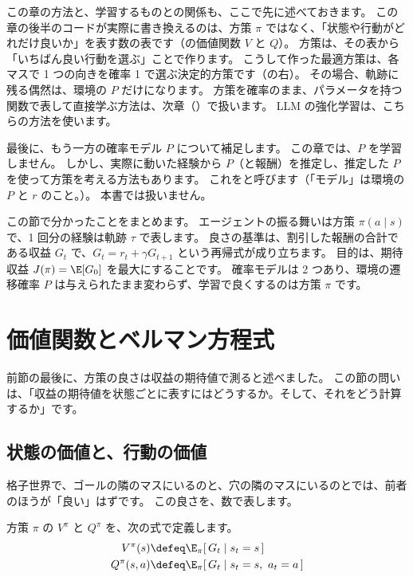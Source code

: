 この章の方法と、学習するものとの関係も、ここで先に述べておきます。
この章の後半のコードが実際に書き換えるのは、方策 $\pi$ ではなく、「状態や行動がどれだけ良いか」を表す数の表です（の価値関数 $V$ と $Q$）。
方策は、その表から「いちばん良い行動を選ぶ」ことで作ります。
こうして作った最適方策は、各マスで 1 つの向きを確率 1 で選ぶ決定的方策です（の右）。
その場合、軌跡に残る偶然は、環境の $P$ だけになります。
方策を確率のまま、パラメータを持つ関数で表して直接学ぶ方法は、次章（）で扱います。
LLM の強化学習は、こちらの方法を使います。

最後に、もう一方の確率モデル $P$ について補足します。
この章では、$P$ を学習しません。
しかし、実際に動いた経験から $P$（と報酬）を推定し、推定した $P$ を使って方策を考える方法もあります。
これをと呼びます（「モデル」は環境の $P$ と $r$ のこと。）。
本書では扱いません。

この節で分かったことをまとめます。
エージェントの振る舞いは方策 $\pi(a\mid s)$ で、1 回分の経験は軌跡 $\tau$ で表します。
良さの基準は、割引した報酬の合計である収益 $G_t$ で、$G_t=r_t+\gamma G_{t+1}$ という再帰式が成り立ちます。
目的は、期待収益 $J(\pi)=\E[G_0]$ を最大にすることです。
確率モデルは 2 つあり、環境の遷移確率 $P$ は与えられたまま変わらず、学習で良くするのは方策 $\pi$ です。

\section{価値関数とベルマン方程式}\label{sec:rlb-value}

前節の最後に、方策の良さは収益の期待値で測ると述べました。
この節の問いは、「収益の期待値を状態ごとに表すにはどうするか。そして、それをどう計算するか」です。

\subsection*{状態の価値と、行動の価値}

格子世界で、ゴールの隣のマスにいるのと、穴の隣のマスにいるのとでは、前者のほうが「良い」はずです。
この良さを、数で表します。

\begin{definition}[価値関数]\label{def:rlb-value}
方策 $\pi$ の $V^\pi$ と $Q^\pi$ を、次の式で定義します。
\begin{align}
V^\pi(s)&\defeq\E_\pi[\,G_t\mid s_t=s\,] \label{eq:rlb-v-def}\\
Q^\pi(s,a)&\defeq\E_\pi[\,G_t\mid s_t=s,\ a_t=a\,] \label{eq:rlb-q-def}
\end{align}
\end{definition}


